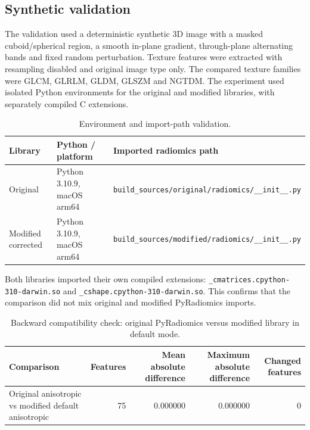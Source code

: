 \subsection{Synthetic validation}

The validation used a deterministic synthetic 3D image with a masked cuboid/spherical region, a smooth in-plane
gradient, through-plane alternating bands and fixed random perturbation. Texture features were extracted with
resampling disabled and original image type only. The compared texture families were GLCM, GLRLM, GLDM, GLSZM and
NGTDM. The experiment used isolated Python environments for the original and modified libraries, with separately
compiled C extensions.

\begin{table}[htbp]
\centering
\caption{Environment and import-path validation.}
\begin{tabular}{lll}
\hline
Library & Python / platform & Imported radiomics path \\
\hline
Original & Python 3.10.9, macOS arm64 &
\texttt{build\_sources/original/radiomics/\_\_init\_\_.py} \\
Modified corrected & Python 3.10.9, macOS arm64 &
\texttt{build\_sources/modified/radiomics/\_\_init\_\_.py} \\
\hline
\end{tabular}
\end{table}

Both libraries imported their own compiled extensions:
\texttt{\_cmatrices.cpython-310-darwin.so} and \texttt{\_cshape.cpython-310-darwin.so}. This confirms that the
comparison did not mix original and modified PyRadiomics imports.

\begin{table}[htbp]
\centering
\caption{Backward compatibility check: original PyRadiomics versus modified library in default mode.}
\begin{tabular}{lrrrr}
\hline
Comparison & Features & Mean absolute difference & Maximum absolute difference & Changed features \\
\hline
Original anisotropic vs modified default anisotropic & 75 & 0.000000 & 0.000000 & 0 \\
\hline
\end{tabular}
\end{table}

